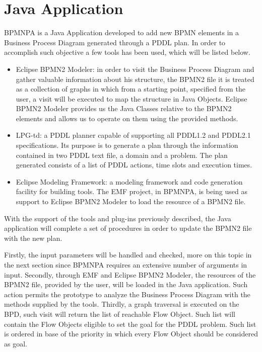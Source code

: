 \chapter{Java Application}
\label{cha:789}


BPMNPA is a Java Application developed to add new BPMN elements in a Business Process Diagram generated through a PDDL plan. In order to accomplish such objective a few tools has been used, which will be listed below.

\begin{itemize}  
\item Eclipse BPMN2 Modeler: in order to visit the Business Process Diagram and gather valuable information about his structure, the BPMN2 file it is treated as a collection of graphs in which from a starting point, specified from the user, a visit will be executed to map the structure in Java Objects. Eclipse BPMN2 Modeler provides us the Java Classes relative to the BPMN2 elements and allows us to operate on them using the provided methods.

\item LPG-td: a PDDL planner capable of supporting all PDDL1.2 and PDDL2.1 specifications. Its purpose is to generate a plan through the information contained in two PDDL text file, a domain and a problem. The plan generated consists of a list of PDDL actions, time slots and execution times. 

\item Eclipse Modeling Framework: a modeling framework and code generation facility for building tools. The EMF project, in BPMNPA, is being used as support to Eclipse BPMN2 Modeler to load the resource of a BPMN2 file.
\end{itemize}



With the support of the tools and plug-ins previously described, the Java application will complete a set of procedures in order to update the BPMN2 file with the new plan.

Firstly, the input parameters will be handled and checked, more on this topic in the next section since BPMNPA requires an extensive number of arguments in input.
Secondly, through EMF and Eclipse BPMN2 Modeler, the resources of the BPMN2 file, provided by the user, will be loaded in the Java application. Such action permits the prototype to analyze the Business Process Diagram with the methods supplied  by the tools.
Thirdly, a graph traversal is executed on the BPD, such visit will return the list of reachable Flow Object. Such list will contain the Flow Objects eligible to set the goal for the PDDL problem. Such list is ordered in base of the priority in which every Flow Object should be considered as goal.

